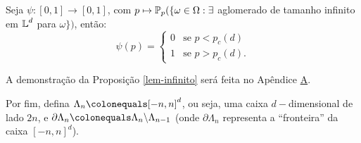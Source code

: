 \begin{mypro}\label{lem-infinito}
	Seja $\psi : [0, 1] \longrightarrow [0, 1]$, com $p \mapsto \operatorname{\mathbb{P}}_p(\{\omega \in \Omega : \exists$ aglomerado de tamanho infinito em $\operatorname{\mathbb{L}}^d$ para $\omega\})$, então:
	\[ \psi(p) = \begin{cases}
	0  &\text{se } p < p_c(d)\\
	1  &\text{se } p > p_c(d).
	\end{cases}
	\]
\end{mypro}
\par A demonstração da Proposição \ref{lem-infinito} será feita no Apêndice \hyperref[apendice-primeiro]{A}.


\par Por fim, defina $\Lambda_n \colonequals [-n, n]^d$, ou seja, uma caixa $d-$dimensional de lado $2n$, e $\partial \Lambda_n \colonequals \Lambda_n \text{\textbackslash} \Lambda_{n-1}$ (onde $\partial \Lambda_n$ representa a ``fronteira'' da caixa $[-n, n]^d$).